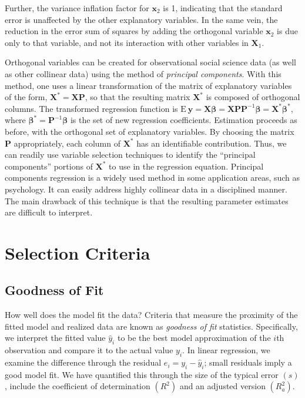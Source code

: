 Further, the variance inflation factor for $\mathbf{x}_2$ is 1,
indicating that the standard error is unaffected by the other
explanatory variables. In the same vein, the reduction in the error
sum of squares by adding the orthogonal variable $\mathbf{x}_2$ is
due only to that variable, and not its interaction with other
variables in $\mathbf{X}_1$.

Orthogonal variables can be created for observational social science
data (as well as other collinear data) using the method of
\emph{principal components}. With this method, one uses a linear
transformation of the matrix of explanatory variables of the form,
$\mathbf{X}^{\ast}=\mathbf{X} \mathbf{P}$, so that the resulting
matrix $\mathbf{X}^{\ast}$ is composed of orthogonal columns. The
transformed regression function is $\mathrm{E~}\mathbf{y}=\mathbf{X}
\boldsymbol \beta = \mathbf{X} \mathbf{P} \mathbf{P}^{-1}
\boldsymbol \beta = \mathbf{X}^{\ast} \boldsymbol \beta^{\ast}$,
where $\boldsymbol \beta^{\ast} = \mathbf{P}^{-1} \boldsymbol \beta$
is the set of new regression coefficients. Estimation proceeds as
before, with the orthogonal set of explanatory variables. By
choosing the matrix $\mathbf{P}$ appropriately, each column of
$\mathbf{X}^{\ast}$ has an identifiable contribution. Thus, we can
readily use variable selection techniques to identify the
``principal components'' portions of $\mathbf{X}^{\ast}$ to use in
the regression equation. Principal components regression is a widely
used method in some application areas, such as psychology. It can
easily address highly collinear data in a disciplined manner. The
main drawback of this technique is that the resulting parameter
estimates are difficult to interpret.


\section{Selection Criteria}


\subsection{Goodness of Fit}

How well does the model fit the data? Criteria that measure the
proximity of the fitted model and realized data are known as
\emph{goodness of fit} statistics. Specifically, we interpret the
fitted value $\hat{y}_i$ to be the best model approximation of the
$i$th observation and compare it to the actual value $y_i$. In
linear regression, we examine the difference through the residual
$e_i= y_i - \hat{y}_i$; small residuals imply a good model fit. We
have quantified this through the size of the typical error $(s)$,
include the coefficient of determination $(R^2)$ and an adjusted
version $(R_{a}^2)$.

